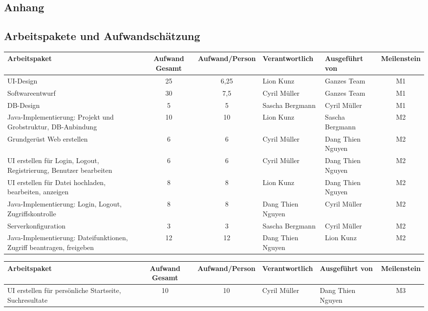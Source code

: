 \begin{landscape}
\section{Anhang}
\subsection{Arbeitspakete und Aufwandschätzung}
\begin{tabularx}{\linewidth}{|X|c|c|l|l|c|} \hline
\textbf{Arbeitspaket}&	\textbf{Aufwand Gesamt}&	\textbf{Aufwand/Person}&	\textbf{Verantwortlich}&	\textbf{Ausgeführt von}&	\textbf{Meilenstein}\\ \hline
UI-Design 																&	25	&	6,25&	Lion Kunz		&	Ganzes Team&	M1\\ \hline
Softwareentwurf															&	30	&	7,5	&	Cyril Müller	&	Ganzes Team&	M1\\ \hline
DB-Design																&	5	&	5	&	Sascha Bergmann	&	Cyril Müller&	M1\\ \hline
Java-Implementierung: Projekt und Grobstruktur, DB-Anbindung			&	10	&	10	&	Lion Kunz		&	Sascha Bergmann&	M2\\ \hline
Grundgerüst Web erstellen												&	6	&	6	&	Cyril Müller	&	Dang Thien Nguyen&	M2\\ \hline
UI erstellen für Login, Logout, Registrierung, Benutzer bearbeiten		&	6	&	6	&	Cyril Müller	&	Dang Thien Nguyen&	M2\\ \hline
UI erstellen für Datei hochladen, bearbeiten, anzeigen					&	8	&	8	&	Lion Kunz		&	Dang Thien Nguyen&	M2\\ \hline
Java-Implementierung: Login, Logout, Zugriffskontrolle					&	8	&	8	&	Dang Thien Nguyen&	Cyril Müller&	M2\\ \hline
Serverkonfiguration														&	3	&	3	&	Sascha Bergmann	&	Cyril Müller&	M2\\ \hline
Java-Implementierung: Dateifunktionen, Zugriff beantragen, freigeben	&	12	&	12	&	Dang Thien Nguyen&	Lion Kunz&	M2\\ \hline
\end{tabularx}
\clearpage
\begin{tabularx}{\linewidth}{|X|c|c|l|l|c|} \hline
\textbf{Arbeitspaket}&	\textbf{Aufwand Gesamt}&	\textbf{Aufwand/Person}&	\textbf{Verantwortlich}&	\textbf{Ausgeführt von}&	\textbf{Meilenstein}\\ \hline
UI erstellen für persönliche Startseite, Suchresultate					&	10	&	10	&	Cyril Müller	&	Dang Thien Nguyen&	M3\\ \hline

\end{tabularx}
\end{landscape}
